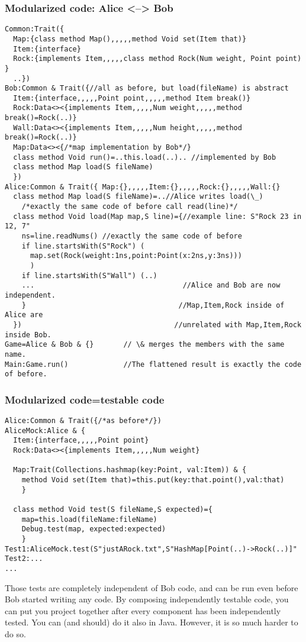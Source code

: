 \begin{frame}[fragile]
\frametitle{Modularized code: Alice <--> Bob}
\begin{NiceCode}{59ex}{0.7}
\begin{lstlisting}
Common:Trait({
  Map:{class method Map(),,,,,method Void set(Item that)}
  Item:{interface}
  Rock:{implements Item,,,,,class method Rock(Num weight, Point point) }
  ..})
Bob:Common & Trait({//all as before, but load(fileName) is abstract
  Item:{interface,,,,,Point point,,,,,method Item break()}
  Rock:Data<><{implements Item,,,,,Num weight,,,,,method break()=Rock(..)}
  Wall:Data<><{implements Item,,,,,Num height,,,,,method break()=Rock(..)}
  Map:Data<><{/*map implementation by Bob*/}
  class method Void run()=..this.load(..).. //implemented by Bob
  class method Map load(S fileName)
  })
Alice:Common & Trait({ Map:{},,,,,Item:{},,,,,Rock:{},,,,,Wall:{}
  class method Map load(S fileName)=..//Alice writes load(\_)
    /*exactly the same code of before call read(line)*/
  class method Void load(Map map,S line)={//example line: S"Rock 23 in 12, 7"
    ns=line.readNums() //exactly the same code of before
    if line.startsWith(S"Rock") (
      map.set(Rock(weight:1ns,point:Point(x:2ns,y:3ns)))
      )
    if line.startsWith(S"Wall") (..)
    ...                                   //Alice and Bob are now independent.
    }                                    //Map,Item,Rock inside of Alice are
  })                                    //unrelated with Map,Item,Rock inside Bob.
Game=Alice & Bob & {}       // \& merges the members with the same name.
Main:Game.run()             //The flattened result is exactly the code of before.
\end{lstlisting}
\end{NiceCode}
\end{frame}

\begin{frame}[fragile]
\frametitle{Modularized code=testable code}
\begin{NiceCode}{59ex}{0.7}
\begin{lstlisting}
Alice:Common & Trait({/*as before*/})
AliceMock:Alice & {
  Item:{interface,,,,,Point point}
  Rock:Data<><{implements Item,,,,,Num weight}

  Map:Trait(Collections.hashmap(key:Point, val:Item)) & {
    method Void set(Item that)=this.put(key:that.point(),val:that)
    }

  class method Void test(S fileName,S expected)={
    map=this.load(fileName:fileName)
    Debug.test(map, expected:expected)
    }
Test1:AliceMock.test(S"justARock.txt",S"HashMap[Point(..)->Rock(..)]"
Test2:...
...
\end{lstlisting}
\end{NiceCode}
Those tests are completely independent of Bob code, and can be run even before
Bob started writing any code.
By composing independently testable code, you can put you project together
after every component has been independently tested.
You can (and should) do it also in Java.
However, it is so much harder to do so.
\end{frame}


